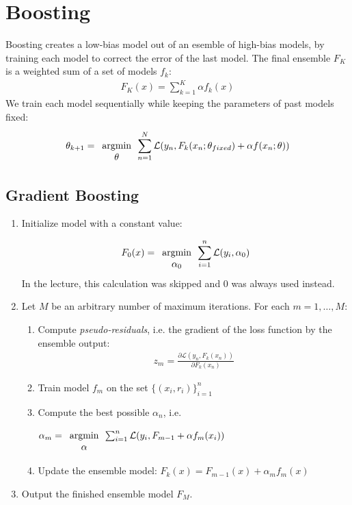 \documentclass{report}
\newcommand{\argmin}[1] {
    \begin{array}{c}
        \vphantom{#1}\\ %
        \text{argmin}\\
        #1\\
        \end{array}
    }
\newcommand{\pd}[2]{\frac{\partial #1}{\partial #2}}
\newcommand{\loss}{\mathcal{L}}
\begin{document}
\section{Boosting}
Boosting creates a low-bias model out of an esemble of high-bias models, by training each model to correct the error of the last model. The final ensemble $F_K$ is a weighted sum of a set of models $f_k$:
\begin{align}
 F_K(x) = \sum_{k=1}^K \alpha f_k(x)
\end{align}
We train each model sequentially while keeping the parameters of past models fixed:
\begin{align}
 \theta_{k+1} = \argmin{\theta}\sum_{n=1}^N \loss(y_n, F_k(x_n; \theta_{fixed}) + \alpha f(x_n; \theta))
\end{align}
\subsection{Gradient Boosting}
\begin{enumerate}
 \item Initialize model with a constant value:
 \begin{align}
  F_0(x) = \argmin{\alpha_0} \sum_{i=1}^n \loss(y_i,\alpha_0)
 \end{align}
 In the lecture, this calculation was skipped and 0 was always used instead.
 \item Let $M$ be an arbitrary number of maximum iterations. For each $m = 1, \hdots, M$:
 \begin{enumerate}
 \item Compute \textit{pseudo-residuals}, i.e. the gradient of the loss function by the ensemble output:
 \begin{align}
  z_m = \pd{\loss(y_n, F_k(x_n))}{F_k (x_n)}
 \end{align}
 \item Train model $f_m$ on the set $\{(x_i,r_i)\}^n_{i=1}$
 \item Compute the best possible $\alpha_n$, i.e. $\alpha_m = \argmin{\alpha} \sum_{i=1}^n \loss(y_i, F_{m-1} + \alpha f_m(x_i))$
  \item Update the ensemble model: $F_k (x) = F_{m-1}(x) + \alpha_m f_m(x)$
 \end{enumerate}
\item Output the finished ensemble model $F_M$.
\end{enumerate}
\end{document}
